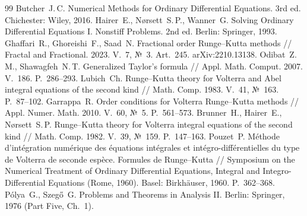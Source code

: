 \documentclass[11pt,a4paper]{article}
\theoremstyle{plain}
\theoremstyle{definition}
\begin{document}
\begin{thebibliography}{99}
 Butcher~J.\,C. Numerical Methods for Ordinary Differential Equations. 3rd ed. Chichester: Wiley, 2016.
 Hairer~E., N{\o}rsett~S.\,P., Wanner~G. Solving Ordinary Differential Equations I. Nonstiff Problems. 2nd ed. Berlin: Springer, 1993.
 Ghaffari~R., Ghoreishi~F., Saad~N. Fractional order Runge--Kutta methods // Fractal and Fractional. 2023. V.~7, №~3. Art.~245. arXiv:2210.13138.
 Odibat~Z.\,M., Shawagfeh~N.\,T. Generalized Taylor's formula // Appl. Math. Comput. 2007. V.~186. P.~286--293.
 Lubich~Ch. Runge--Kutta theory for Volterra and Abel integral equations of the second kind // Math. Comp. 1983. V.~41, №~163. P.~87--102.
 Garrappa~R. Order conditions for Volterra Runge--Kutta methods // Appl. Numer. Math. 2010. V.~60, №~5. P.~561--573.
 Brunner~H., Hairer~E., N{\o}rsett~S.\,P. Runge--Kutta theory for Volterra integral equations of the second kind // Math. Comp. 1982. V.~39, №~159. P.~147--163.
 Pouzet~P. Méthode d'intégration numérique des équations intégrales et intégro-différentielles du type de Volterra de seconde espèce. Formules de Runge--Kutta // Symposium on the Numerical Treatment of Ordinary Differential Equations, Integral and Integro-Differential Equations (Rome, 1960). Basel: Birkhäuser, 1960. P.~362--368.
 P\'olya~G., Szeg\H{o}~G. Problems and Theorems in Analysis II. Berlin: Springer, 1976 (Part Five, Ch.~1).
\end{thebibliography}
\end{document}
